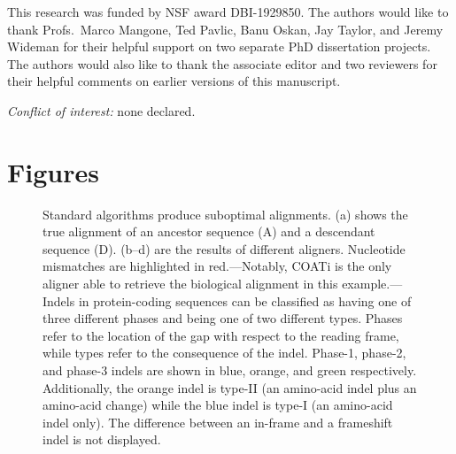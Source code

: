 \documentclass[12pt,letterpaper]{article}
\begin{document}
This research was funded by NSF award DBI-1929850.
%
The authors would like to thank Profs.\ Marco Mangone, Ted Pavlic, Banu Oskan, Jay Taylor, and Jeremy Wideman for their helpful support on two separate PhD dissertation projects. The authors would also like to thank the associate editor and two reviewers for their helpful comments on earlier versions of this manuscript.

\noindent \textit{Conflict of interest:} none declared.

\newpage
\section*{Figures}

\begin{figure}[ht]
    \centering%
    \par
    \caption{
        Standard algorithms produce suboptimal alignments.
        (a) shows the true alignment of an ancestor sequence (A) and a descendant sequence (D).
        (b--d) are the results of different aligners. Nucleotide mismatches are highlighted in red.---Notably, COATi is the only aligner able to retrieve the biological alignment in this example.---%
        Indels in protein-coding sequences can be classified as having one of three different phases and being one of two different types.
        Phases refer to the location of the gap with respect to the reading frame, while types refer to the consequence of the indel.
        Phase-1, phase-2, and phase-3 indels are shown in blue, orange, and green respectively.
        Additionally, the orange indel is type-II (an amino-acid indel plus an amino-acid change) while the blue indel is type-I (an amino-acid indel only). The difference between an in-frame and a frameshift indel is not displayed.
        \label{fig:aln}}
\end{figure}
\end{document}
